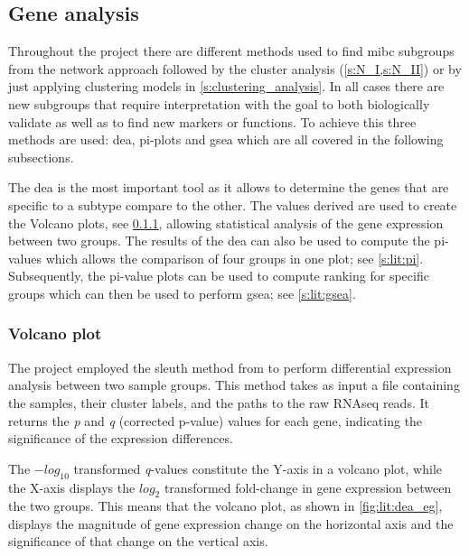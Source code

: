 \subsection{Gene analysis} \label{s:lit:gene_analysis}


Throughout the project there are different methods used to find \acrfull{mibc} subgroups from the network approach followed by the cluster analysis (\cref{s:N_I,s:N_II}) or by just applying clustering models in \cref{s:clustering_analysis}. In all cases there are new subgroups that require interpretation with the goal to both biologically validate as well as to find new markers or functions. To achieve this three methods are used: \acrlong{dea}, pi-plots and \acrlong{gsea} which are all covered in the following subsections. 

The \acrshort{dea} is the most important tool as it allows to determine the genes that are specific to a subtype compare to the other. The values derived are used to create the Volcano plots, see \cref{s:lit:dea}, allowing statistical analysis of the gene expression between two groups. The results of the \acrshort{dea} can also be used to compute the pi-values \citep{Xiao2014-zn} which allows the comparison of four groups in one plot; see \cref{s:lit:pi}. Subsequently, the pi-value plots can be used to compute ranking for specific groups which can then be used to perform \acrlong{gsea}; see \cref{s:lit:gsea}.


\subsubsection{Volcano plot} \label{s:lit:dea}


The project employed the sleuth method from \citeauthor{Pimentel2017-xp} to perform differential expression analysis between two sample groups. This method takes as input a file containing the samples, their cluster labels, and the paths to the raw RNAseq reads. It returns the \textit{p} and \textit{q} (corrected p-value) values for each gene, indicating the significance of the expression differences.

The $-log_{10}$ transformed \textit{q}-values constitute the Y-axis in a volcano plot, while the X-axis displays the $log_{2}$ transformed fold-change in gene expression between the two groups. This means that the volcano plot, as shown in \cref{fig:lit:dea_eg}, displays the magnitude of gene expression change on the horizontal axis and the significance of that change on the vertical axis.

